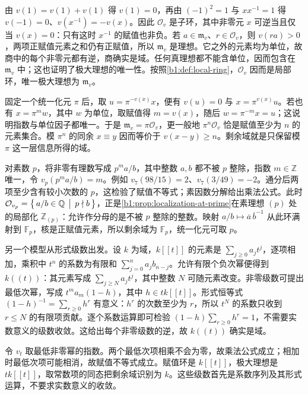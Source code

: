 \ProseParagraphBreak
由 \(v(1)=v(1)+v(1)\) 得 \(v(1)=0\)，再由 \((-1)^2=1\) 与 \(xx^{-1}=1\) 得 \(v(-1)=0\)、\(v(x^{-1})=-v(x)\)。因此 \(\mathcal O_v\) 是子环，其中非零元 \(x\) 可逆当且仅当 \(v(x)=0\)：只有这时 \(x^{-1}\) 的赋值也非负。若 \(a\in\mathfrak m_v\)、\(r\in\mathcal O_v\)，则 \(v(ra)>0\)，两项正赋值元素之和仍有正赋值，所以 \(\mathfrak m_v\) 是理想。它之外的元素均为单位，故商中的每个非零元都有逆，商确实是域。任何真理想都不能含单位，因而包含在 \(\mathfrak m_v\) 中；这也证明了极大理想的唯一性。按照\cref{b1:def:local-ring}，\(\mathcal O_v\) 因而是局部环，唯一极大理想为 \(\mathfrak m_v\)。

\ProseParagraphBreak
固定一个统一化元 \(\pi\) 后，取 \(u=\pi^{-v(x)}x\)，便有 \(v(u)=0\) 与 \(x=\pi^{v(x)}u\)。若也有 \(x=\pi^mw\)，其中 \(w\) 为单位，取赋值得 \(m=v(x)\)，随后 \(w=\pi^{-m}x=u\)；这说明指数与单位因子都唯一。于是 \(\mathfrak m_v=\pi\mathcal O_v\)，更一般地 \(\pi^n\mathcal O_v\) 恰是赋值至少为 \(n\) 的元素集合。模 \(\pi^n\) 的同余 \(x\equiv y\) 因而等价于 \(v(x-y)\geq n\)。剩余域就是只保留模 \(\pi\) 这一层信息所得的域。

\ProseParagraphBreak
对素数 \(p\)，将非零有理数写成 \(p^ma/b\)，其中整数 \(a,b\) 都不被 \(p\) 整除，指数 \(m\in\mathbb Z\) 唯一，令 \(v_p(p^ma/b)=m\)。例如 \(v_7(98/15)=2\)、\(v_7(3/49)=-2\)。通分后两项至少含有较小次数的 \(p\)，这检验了赋值不等式；素因数分解给出乘法公式。此时 \(\mathcal O_{v_p}=\bigl\{\,a/b\in\mathbb Q\,\bigm|\,p\nmid b\,\bigr\}\)，正是\cref{b1:prop:localization-at-prime}在素理想 \((p)\) 处的局部化 \(\mathbb Z_{(p)}\)：允许作分母的是不被 \(p\) 整除的整数。映射 \(a/b\mapsto\overline a\,\overline b^{-1}\) 从此环满射到 \(\mathbb F_p\)，核是正赋值元素，所以剩余域为 \(\mathbb F_p\)，统一化元可取 \(p\)。

\ProseParagraphBreak
另一个模型从形式级数出发。设 \(k\) 为域，\(k[\![t]\!]\) 的元素是 \(\sum_{j\geq0}a_jt^j\)，逐项相加，乘积中 \(t^n\) 的系数为有限和 \(\sum_{j=0}^na_jb_{n-j}\)。允许有限个负次幂便得到 \(k(\!(t)\!)\)：其元素写成 \(\sum_{j\geq N}a_jt^j\)，其中整数 \(N\) 可随元素改变。非零级数可提出最低次幂，写成 \(t^ma_m(1-h)\)，其中 \(h\in tk[\![t]\!]\)。形式恒等式 \((1-h)^{-1}=\sum_{r\geq0}h^r\) 有意义：\(h^r\) 的次数至少为 \(r\)，所以 \(t^N\) 的系数只收到 \(r\leq N\) 的有限项贡献。逐个系数运算即可检验 \((1-h)\sum_{r\geq0}h^r=1\)，不需要实数意义的级数收敛。这给出每个非零级数的逆，故 \(k(\!(t)\!)\) 确实是域。

\ProseParagraphBreak
令 \(v_t\) 取最低非零幂的指数。两个最低次项相乘不会为零，故乘法公式成立；相加时最低次项可能相消，故赋值不等式成立。赋值环是 \(k[\![t]\!]\)，极大理想是 \(tk[\![t]\!]\)，取常数项的同态把剩余域识别为 \(k\)。这些级数首先是系数序列及其形式运算，不要求实数意义的收敛。

